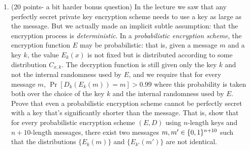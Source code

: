 \documentclass{article}
\begin{document}
\begin{enumerate}[noitemsep,topsep=\mdcompacttopsep,start=4]
\item{}(20 points- a bit harder bonus question)  In the lecture we saw that any perfectly secret private key encryption
scheme needs to use a key as large as the message. But we
actually made an implicit subtle assumption: that the encryption
process is \emph{deterministic}. In a \emph{probabilistic encryption scheme}, the encryption function $E$ may be probabilistic: 
that is, given a message $m$ and a key $k$, the value $E_k(x)$ is not fixed but is distributed according to some distribution $C_{x,k}$. 
The decryption function is still given only the key $k$ and not the internal randomness used by $E$, and we require that for every message $m$, $\Pr[D_k(E_k(m))=m]>0.99$
where this probability is taken both over the choice of the key $k$ and the internal randomness used by $E$. Prove that even a probabilistic encryption scheme cannot be perfectly secret with a key that's significantly shorter than the message. That is, show
that for every probabilistic encryption scheme $(E,D)$  using $n$-length keys and $n+10$-length messages, there exist two messages $m,m'\in \{0,1\}^{n+10}$
such that the distributions $\{ E_k(m) \}$ and $\{ E_{k'}(m') \}$ are not identical.


\end{enumerate}
\end{document}

